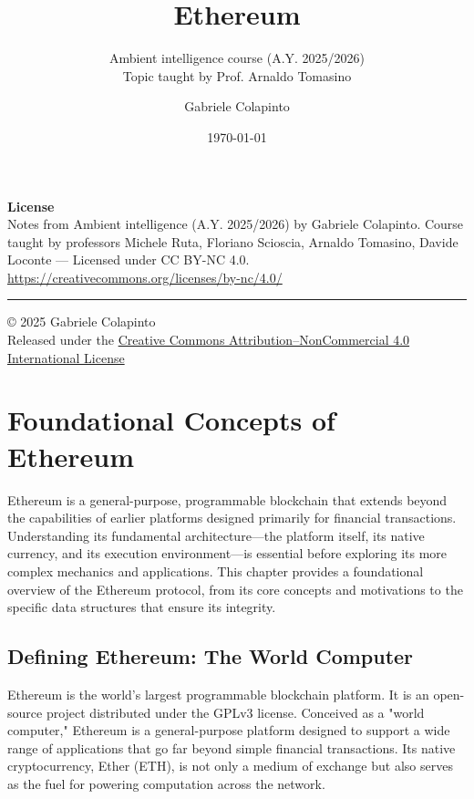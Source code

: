 \documentclass{scrbook}
\title{Ethereum}
\subtitle{Ambient intelligence course (A.Y. 2025/2026)\\Topic taught by Prof. Arnaldo Tomasino}
\author{Gabriele Colapinto}
\date{\today}
\begin{document}
\maketitle
\thispagestyle{empty}

{\Large\textbf{License}} \\
{Notes from Ambient intelligence (A.Y. 2025/2026) by Gabriele Colapinto. 
Course taught by professors Michele Ruta, Floriano Scioscia, Arnaldo Tomasino, Davide Loconte — 
Licensed under CC BY-NC 4.0.\\
\url{https://creativecommons.org/licenses/by-nc/4.0/}}

\vspace*{\fill}
\rule{\textwidth}{0.2pt}
\small{© 2025 Gabriele Colapinto \\
Released under the \href{https://creativecommons.org/licenses/by-nc/4.0/}{Creative Commons Attribution–NonCommercial 4.0 International License}}

\clearpage

\tableofcontents

\chapter{Foundational Concepts of Ethereum}

Ethereum is a general-purpose, programmable blockchain that extends beyond the capabilities of earlier platforms designed primarily for financial transactions. Understanding its fundamental architecture—the platform itself, its native currency, and its execution environment—is essential before exploring its more complex mechanics and applications. This chapter provides a foundational overview of the Ethereum protocol, from its core concepts and motivations to the specific data structures that ensure its integrity.

\section{Defining Ethereum: The World Computer}

Ethereum is the world's largest programmable blockchain platform. It is an open-source project distributed under the GPLv3 license. Conceived as a "world computer," Ethereum is a general-purpose platform designed to support a wide range of applications that go far beyond simple financial transactions. Its native cryptocurrency, Ether (ETH), is not only a medium of exchange but also serves as the fuel for powering computation across the network.
\end{document}

